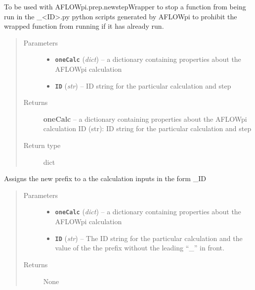 \documentclass[letterpaper,10pt,english]{sphinxmanual}
\begin{document}

\begin{fulllineitems}
\label{prep:prep.__lock_transform}
To be used with AFLOWpi.prep.newstepWrapper to stop a function from being run in the
\_\textless{}ID\textgreater{}.py python scripts generated by AFLOWpi to prohibit the wrapped function
from running if it has already run.
\begin{quote}\begin{description}
\item[{Parameters}] \leavevmode\begin{itemize}
\item {} 
\textbf{\texttt{oneCalc}} (\emph{dict}) -- a dictionary containing properties about the AFLOWpi calculation

\item {} 
\textbf{\texttt{ID}} (\emph{str}) -- ID string for the particular calculation and step

\end{itemize}

\item[{Returns}] \leavevmode
\textbf{oneCalc} --
a dictionary containing properties about the AFLOWpi calculation
ID (str): ID string for the particular calculation and step

\item[{Return type}] \leavevmode
dict

\end{description}\end{quote}

\end{fulllineitems}


\begin{fulllineitems}
\label{prep:prep.__modifyInputPrefixPW}
Assigns the new prefix to a the calculation inputs in the form \_ID
\begin{quote}\begin{description}
\item[{Parameters}] \leavevmode\begin{itemize}
\item {} 
\textbf{\texttt{oneCalc}} (\emph{dict}) -- a dictionary containing properties about the AFLOWpi calculation

\item {} 
\textbf{\texttt{ID}} (\emph{str}) -- The ID string for the particular calculation and the value of the the
prefix without the leading ``\_'' in front.

\end{itemize}

\item[{Returns}] \leavevmode
None

\end{description}\end{quote}

\end{fulllineitems}
\end{document}
